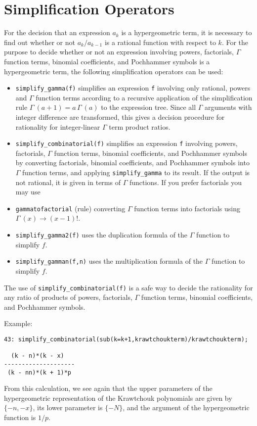 \section{Simplification Operators}
For the decision that an expression $a_k$ is a hypergeometric term, it is
necessary to find out whether or not $a_{k}/a_{k-1}$ is a rational
function with respect to $k$. For the purpose to decide
whether or not an expression involving powers, factorials,
$\Gamma$ function terms,
binomial coefficients, and Pochhammer symbols is a hypergeometric term,
the following simplification operators can be used:
\begin{itemize}
\item
{\tt simplify\verb+_+gamma(f)} simplifies an expression {\tt f} involving
only rational, powers and $\Gamma$ function terms according to a recursive
application of the simplification rule $\Gamma\:(a+1)=a\,\Gamma\:(a)$
to the expression tree. Since all $\Gamma$ arguments with integer difference
are transformed, this gives a decision procedure for rationality
for integer-linear $\Gamma$ term product ratios.
\item
{\tt simplify\verb+_+combinatorial(f)} simplifies an expression {\tt f}
involving powers, factorials, $\Gamma$ function terms,
binomial coefficients, and Pochhammer symbols by converting
factorials, binomial coefficients, and Poch\-hammer symbols into
$\Gamma$ function terms, and applying {\tt simplify\verb+_+gamma} to its
result. If the output is not rational,
it is given in terms of $\Gamma$ functions. If you prefer factorials
you may use
\item
{\tt gammatofactorial} (rule) converting $\Gamma$ function terms into
factorials using $\Gamma\:(x)\rightarrow (x-1)!$.
\item
{\tt simplify\verb+_+gamma2(f)}
uses the duplication formula of the $\Gamma$ function to simplify $f$.
\item
{\tt simplify\verb+_+gamman(f,n)}
uses the multiplication formula of the $\Gamma$ function to simplify $f$.
\end{itemize}
The use of {\tt simplify\verb+_+combinatorial(f)} is a safe way to
decide the rationality for any ratio of products of powers, factorials,
$\Gamma$ function terms, binomial coefficients, and Pochhammer symbols.

Example:

{\small
\begin{verbatim}
43: simplify_combinatorial(sub(k=k+1,krawtchoukterm)/krawtchoukterm);

  (k - n)*(k - x)
--------------------
 (k - nn)*(k + 1)*p
\end{verbatim}
}\noindent
From this calculation, we see again that the upper parameters of
the hypergeometric representation of the Krawtchouk polynomials are given by
$\{-n,-x\}$, its lower parameter is $\{-N\}$, and the argument of the
hypergeometric function is $1/p$.

